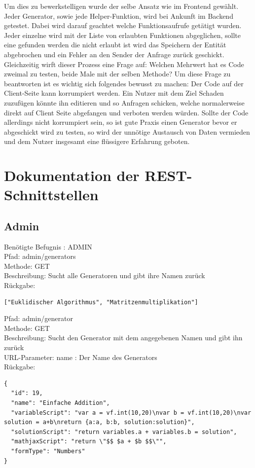 Um dies zu bewerkstelligen wurde der selbe Ansatz wie im Frontend gewählt. Jeder Generator, sowie jede Helper-Funktion, wird bei Ankunft im Backend getestet. Dabei wird darauf geachtet welche Funktionsaufrufe getätigt wurden. Jeder einzelne wird mit der Liste von erlaubten Funktionen abgeglichen, sollte eine gefunden werden die nicht erlaubt ist wird das Speichern der Entität abgebrochen und ein Fehler an den Sender der Anfrage zurück geschickt. \\

Gleichzeitig wirft dieser Prozess eine Frage auf: Welchen Mehrwert hat es Code zweimal zu testen, beide Male mit der selben Methode? Um diese Frage zu beantworten ist es wichtig sich folgendes bewusst zu machen: Der Code auf der Client-Seite kann korrumpiert werden. Ein Nutzer mit dem Ziel Schaden zuzufügen könnte ihn editieren und so Anfragen schicken, welche normalerweise direkt auf Client Seite abgefangen und verboten werden würden. Sollte der Code allerdings nicht korrumpiert sein, so ist gute Praxis einen Generator bevor er abgeschickt wird zu testen, so wird der unnötige Austausch von Daten vermieden und dem Nutzer insgesamt eine flüssigere Erfahrung geboten.


\section{Dokumentation der REST-Schnittstellen}

\subsection{Admin}

Benötigte Befugnis : ADMIN \\

\noindent Pfad: admin/generators \\
Methode: GET \\
Beschreibung: Sucht alle Generatoren und gibt ihre Namen zurück \\
Rückgabe: \begin{lstlisting} 
["Euklidischer Algorithmus", "Matritzenmultiplikation"]
\end{lstlisting}

\noindent Pfad: admin/generator \\
Methode: GET \\
Beschreibung: Sucht den Generator mit dem angegebenen Namen und gibt ihn zurück \\
URL-Parameter: name : Der Name des Generators \\
Rückgabe: \begin{lstlisting} 
{
  "id": 19,
  "name": "Einfache Addition",
  "variableScript": "var a = vf.int(10,20)\nvar b = vf.int(10,20)\nvar solution = a+b\nreturn {a:a, b:b, solution:solution}",
  "solutionScript": "return variables.a + variables.b = solution",
  "mathjaxScript": "return \"$$ $a + $b $$\"",
  "formType": "Numbers"
}
\end{lstlisting}


